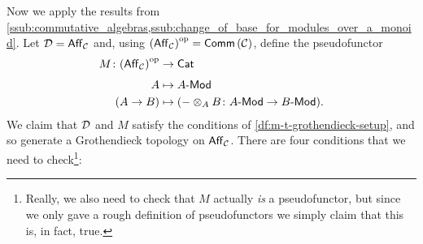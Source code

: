         Now we apply the results from \cref{ssub:commutative_algebras,ssub:change_of_base_for_modules_over_a_monoid}.
        Let $\mathcal{D}=\mathsf{Aff}_{\mathcal{C}}$ and, using ${(\mathsf{Aff}_{\mathcal{C}})}^{\mathrm{op}}=\mathsf{Comm}\left({\mathcal{C}}\right)$, define the pseudofunctor
        \begin{align}\label{eq:m-and-d-for-fpqc}
            M\colon{(\mathsf{Aff}_{\mathcal{C}})}^{\mathrm{op}}&\to\mathsf{Cat}\\[.35em]
            A&\mapsto{{A}\hbox{-}\mathsf{Mod}}\nonumber\\
            (A\to B)&\mapsto({-}\otimes_A B\colon{{A}\hbox{-}\mathsf{Mod}}\to{{B}\hbox{-}\mathsf{Mod}}).\nonumber
        \end{align}
        We claim that $\mathcal{D}$ and $M$ satisfy the conditions of \cref{df:m-t-grothendieck-setup}, and so generate a Grothendieck topology on $\mathsf{Aff}_{\mathcal{C}}$.
        There are four conditions that we need to check\footnote{
            Really, we also need to check that $M$ actually \emph{is} a pseudofunctor, but since we only gave a rough definition of pseudofunctors we simply claim that this is, in fact, true.
        }:
